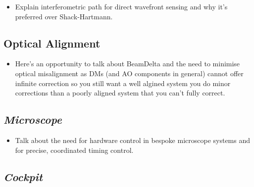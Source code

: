 \begin{itemize}
	\item Explain interferometric path for direct wavefront sensing and why it's preferred over Shack-Hartmann.
\end{itemize}

\subsection{Optical Alignment}
\label{subsec:alignment}
	
\begin{itemize}
	\item Here's an opportunity to talk about BeamDelta and the need to minimise optical misalignment as DMs (and  AO components in general) cannot offer infinite correction so you still want a well algined system you do minor corrections than a poorly aligned system that you can't fully correct.
\end{itemize}

\subsection{\textit{Microscope}}
\label{subsec:microscope}
	
\begin{itemize}
	\item Talk about the need for hardware control in bespoke microscope systems and for precise, coordinated timing control.
\end{itemize}

\subsection{\textit{Cockpit}}
\label{subsec:cockpit}

